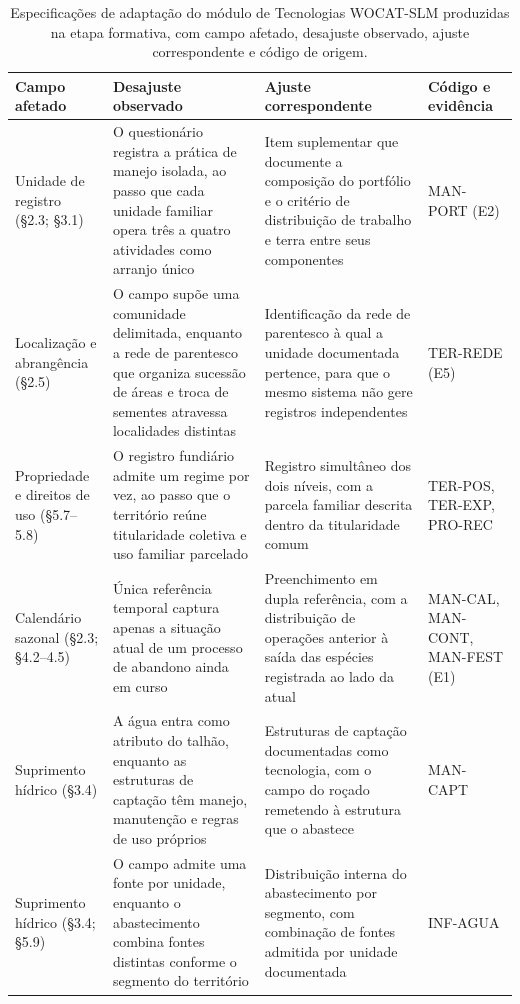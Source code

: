 \documentclass[preprint,authoryear,12pt]{elsarticle}
\begin{document}
\begin{table}[H]
\centering
\caption{Especificações de adaptação do módulo de Tecnologias WOCAT-SLM produzidas na etapa formativa, com campo afetado, desajuste observado, ajuste correspondente e código de origem.}
\label{tab:especificacoes_adaptacao}
\footnotesize
\setlength{\tabcolsep}{4pt}
\begin{tabular}{p{2.6cm}p{4.0cm}p{3.7cm}p{2.5cm}}
\toprule
\textbf{Campo afetado} & \textbf{Desajuste observado} & \textbf{Ajuste correspondente} & \textbf{Código e evidência} \\
\midrule
Unidade de registro (§2.3; §3.1) & O questionário registra a prática de manejo isolada, ao passo que cada unidade familiar opera três a quatro atividades como arranjo único & Item suplementar que documente a composição do portfólio e o critério de distribuição de trabalho e terra entre seus componentes & MAN-PORT (E2) \\
\addlinespace
Localização e abrangência (§2.5) & O campo supõe uma comunidade delimitada, enquanto a rede de parentesco que organiza sucessão de áreas e troca de sementes atravessa localidades distintas & Identificação da rede de parentesco à qual a unidade documentada pertence, para que o mesmo sistema não gere registros independentes & TER-REDE (E5) \\
\addlinespace
Propriedade e direitos de uso (§5.7--5.8) & O registro fundiário admite um regime por vez, ao passo que o território reúne titularidade coletiva e uso familiar parcelado & Registro simultâneo dos dois níveis, com a parcela familiar descrita dentro da titularidade comum & TER-POS, TER-EXP, PRO-REC \\
\addlinespace
Calendário sazonal (§2.3; §4.2--4.5) & Única referência temporal captura apenas a situação atual de um processo de abandono ainda em curso & Preenchimento em dupla referência, com a distribuição de operações anterior à saída das espécies registrada ao lado da atual & MAN-CAL, MAN-CONT, MAN-FEST (E1) \\
\addlinespace
Suprimento hídrico (§3.4) & A água entra como atributo do talhão, enquanto as estruturas de captação têm manejo, manutenção e regras de uso próprios & Estruturas de captação documentadas como tecnologia, com o campo do roçado remetendo à estrutura que o abastece & MAN-CAPT \\
\addlinespace
Suprimento hídrico (§3.4; §5.9) & O campo admite uma fonte por unidade, enquanto o abastecimento combina fontes distintas conforme o segmento do território & Distribuição interna do abastecimento por segmento, com combinação de fontes admitida por unidade documentada & INF-AGUA \\

\end{tabular}
\end{table}
\end{document}
